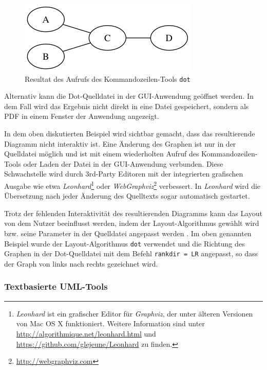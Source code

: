 \begin{figure}[hbt]
    \centering
    \includegraphics[scale=0.75]{resources/graphviz-dot-example.png}
    \caption{Resultat des Aufrufs des Kommandozeilen-Tools \texttt{dot}}
    \label{fig:graphviz-dot-example}
\end{figure}

Alternativ kann die Dot-Quelldatei in der GUI-Anwendung geöffnet werden. In dem Fall wird das Ergebnis nicht direkt in eine Datei gespeichert, sondern als PDF in einem Fenster der Anwendung angezeigt.

In dem oben diskutierten Beispiel wird sichtbar gemacht, dass das resultierende Diagramm nicht interaktiv ist. Eine Änderung des Graphen ist nur in der Quelldatei möglich und ist mit einem wiederholten Aufruf des Kommandozeilen-Tools oder Laden der Datei in der GUI-Anwendung verbunden. Diese Schwachstelle wird durch 3rd-Party Editoren mit der integrierten grafischen Ausgabe wie etwa \textit{Leonhard}\footnote{\textit{Leonhard} ist ein grafischer Editor für \textit{Graphviz}, der unter älteren Versionen von Mac OS X funktioniert. Weitere Information sind unter \url{http://algorithmique.net/leonhard.html} und \url{https://github.com/glejeune/Leonhard} zu finden.} oder \textit{WebGraphviz}\footnote{\url{http://webgraphviz.com}} verbessert. In \textit{Leonhard} wird die Übersetzung nach jeder Änderung des Quelltexts sogar automatisch gestartet.

Trotz der fehlenden Interaktivität des resultierenden Diagramms kann das Layout von dem Nutzer beeinflusst werden, indem der Layout-Algorithmus gewählt wird bzw. seine Parameter in der Quelldatei angepasst werden \cite{NorthGansner14Dot-Manual}. Im oben genannten Beispiel wurde der Layout-Algorithmus \texttt{dot} verwendet und die Richtung des Graphen in der Dot-Quelldatei mit dem Befehl \texttt{rankdir = LR} angepasst, so dass der Graph von links nach rechts gezeichnet wird.

\subsubsection{Textbasierte UML-Tools}

